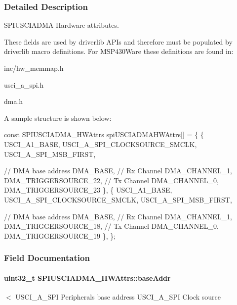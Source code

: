 \subsubsection{Detailed Description}
S\+P\+I\+U\+S\+C\+I\+A\+D\+M\+A Hardware attributes. 

These fields are used by driverlib A\+P\+Is and therefore must be populated by driverlib macro definitions. For M\+S\+P430\+Ware these definitions are found in\+:
\begin{DoxyItemize}
\item inc/hw\+\_\+memmap.\+h
\item usci\+\_\+a\+\_\+spi.\+h
\item dma.\+h
\end{DoxyItemize}

A sample structure is shown below\+: 
\begin{DoxyCode}
\textcolor{keyword}{const} SPIUSCIADMA_HWAttrs spiUSCIADMAHWAttrs[] = \{
    \{
        USCI\_A1\_BASE,
        USCI\_A\_SPI\_CLOCKSOURCE\_SMCLK,
        USCI\_A\_SPI\_MSB\_FIRST,

        \textcolor{comment}{// DMA base address}
        DMA\_BASE,
        \textcolor{comment}{// Rx Channel}
        DMA\_CHANNEL\_1,
        DMA\_TRIGGERSOURCE\_22,
        \textcolor{comment}{// Tx Channel}
        DMA\_CHANNEL\_0,
        DMA\_TRIGGERSOURCE\_23
    \},
    \{
        USCI\_A1\_BASE,
        USCI\_A\_SPI\_CLOCKSOURCE\_SMCLK,
        USCI\_A\_SPI\_MSB\_FIRST,

        \textcolor{comment}{// DMA base address}
        DMA\_BASE,
        \textcolor{comment}{// Rx Channel}
        DMA\_CHANNEL\_1,
        DMA\_TRIGGERSOURCE\_18,
        \textcolor{comment}{// Tx Channel}
        DMA\_CHANNEL\_0,
        DMA\_TRIGGERSOURCE\_19
    \},
\};
\end{DoxyCode}
 

\subsubsection{Field Documentation}
\paragraph[{base\+Addr}]{\setlength{\rightskip}{0pt plus 5cm}uint32\+\_\+t S\+P\+I\+U\+S\+C\+I\+A\+D\+M\+A\+\_\+\+H\+W\+Attrs\+::base\+Addr}\label{struct_s_p_i_u_s_c_i_a_d_m_a___h_w_attrs_a12d6702a8f9d28940b3c1a8791105fd1}
$<$ U\+S\+C\+I\+\_\+\+A\+\_\+\+S\+P\+I Peripheral\textquotesingle{}s base address U\+S\+C\+I\+\_\+\+A\+\_\+\+S\+P\+I Clock source 
